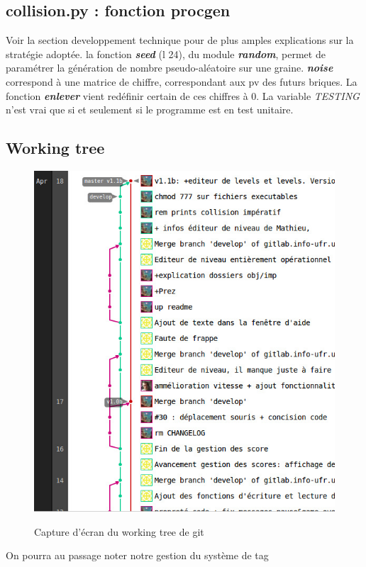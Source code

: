   \newpage
  \subsection{collision.py : fonction procgen}
  	\begin{minipage}{1\textwidth}
  	  \nopagebreak
  	\end{minipage}
  	
  	Voir la section developpement technique pour de plus amples explications sur la stratégie adoptée. la fonction {\bf \em seed} (l 24), du module {\bf \em random}, permet de paramétrer la génération de nombre pseudo-aléatoire sur une graine. {\bf \em noise} correspond à une matrice de chiffre, correspondant aux pv des futurs briques. La fonction {\bf \em enlever} vient redéfinir certain de ces chiffres à 0. La variable {\em TESTING} n'est vrai que si et seulement si le programme est en test unitaire.

  \newpage
  \subsection{Working tree}
    \begin{figure}[hb!]
  	  \caption{Capture d'écran du working tree de git}
  	  \centering
  	  \includegraphics[width=1.1\textwidth]{img/workingtree.jpg}\\[2em]
  	\end{figure}
  	On pourra au passage noter notre gestion du système de tag
  
